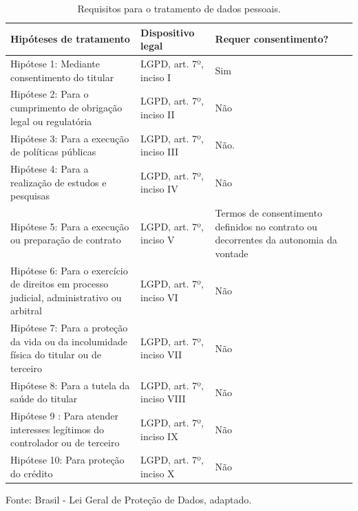 \documentclass[
	12pt,				%
	openright,			%
	oneside,			%
	a4paper,			%
	english,			%
	french,				%
	spanish,			%
	brazil,				%
	]{abntex2}
\begin{document}
\begin{table}[ht]
    \centering
    \caption{Requisitos para o tratamento de dados pessoais.}
    \label{tab: requisitos de tratamento de dados}
    \begin{tabular}{|p{5 cm}|p{4.5cm}|p{5cm}|} 
        \hline
        \textbf{Hipóteses de tratamento} & \textbf{Dispositivo legal} & \textbf{Requer consentimento?} \\ \hline
        
         Hipótese 1: Mediante consentimento do titular & LGPD, art. 7º, inciso I & Sim \\ \hline
         
        Hipótese 2: Para o cumprimento de obrigação legal ou regulatória & LGPD, art. 7º, inciso II & Não  \\ \hline
        
        Hipótese 3: Para a execução de políticas públicas
 & LGPD, art. 7º, inciso III & Não. \\ \hline
 
        Hipótese 4: Para a realização de estudos e pesquisas & LGPD, art. 7º, inciso IV & Não  \\ \hline
        
        Hipótese 5: Para a execução ou preparação de contrato & LGPD, art. 7º, inciso V & Termos de consentimento definidos no contrato ou decorrentes da autonomia da vontade  \\ \hline
        
        Hipótese 6: Para o exercício de direitos em processo judicial, administrativo ou arbitral & LGPD, art. 7º, inciso VI & Não  \\ \hline
        
        Hipótese 7: Para a proteção da vida ou da incolumidade física do titular ou de terceiro & LGPD, art. 7º, inciso VII & Não  \\ \hline
        
        Hipótese 8: Para a tutela da saúde do titular & LGPD, art. 7º, inciso VIII & Não  \\ \hline
        
        Hipótese 9 : Para atender interesses legítimos do controlador ou de terceiro & LGPD, art. 7º, inciso IX & Não  \\ \hline
        
        Hipótese 10: Para proteção do crédito & LGPD, art. 7º, inciso X & Não  \\ \hline
    \end{tabular}
    \newline \newline Fonte: Brasil - Lei Geral de Proteção de Dados, adaptado.
\end{table}
\end{document}
